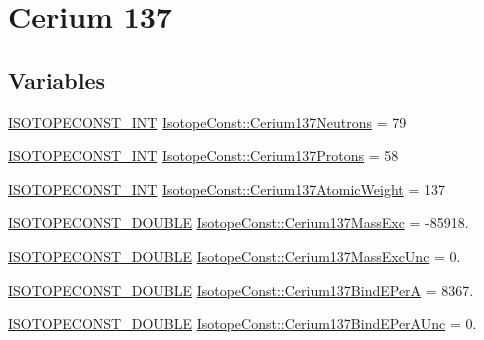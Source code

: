 \hypertarget{group___isotope_const-_cerium-_ce137}{}\section{Cerium 137}
\label{group___isotope_const-_cerium-_ce137}
\subsection*{Variables}
\begin{DoxyCompactItemize}
\item 
\mbox{\hyperlink{group___isotope_const-_macros_ga5f18360b3e99483a35c32d789e62621c}{I\+S\+O\+T\+O\+P\+E\+C\+O\+N\+S\+T\+\_\+\+I\+NT}} \mbox{\hyperlink{group___isotope_const-_cerium-_ce137_ga23377c25175b47810b78da77ab370f87}{Isotope\+Const\+::\+Cerium137\+Neutrons}} = 79
\item 
\mbox{\hyperlink{group___isotope_const-_macros_ga5f18360b3e99483a35c32d789e62621c}{I\+S\+O\+T\+O\+P\+E\+C\+O\+N\+S\+T\+\_\+\+I\+NT}} \mbox{\hyperlink{group___isotope_const-_cerium-_ce137_gaaee6a58822cbd8ac166791f5f5d9527f}{Isotope\+Const\+::\+Cerium137\+Protons}} = 58
\item 
\mbox{\hyperlink{group___isotope_const-_macros_ga5f18360b3e99483a35c32d789e62621c}{I\+S\+O\+T\+O\+P\+E\+C\+O\+N\+S\+T\+\_\+\+I\+NT}} \mbox{\hyperlink{group___isotope_const-_cerium-_ce137_gad97ec2de878b7311ae7112dc012c27ae}{Isotope\+Const\+::\+Cerium137\+Atomic\+Weight}} = 137
\item 
\mbox{\hyperlink{group___isotope_const-_macros_ga8f45a7272ce02c0b4c65c44636ed719a}{I\+S\+O\+T\+O\+P\+E\+C\+O\+N\+S\+T\+\_\+\+D\+O\+U\+B\+LE}} \mbox{\hyperlink{group___isotope_const-_cerium-_ce137_gaa98d9bfdb6961fb1de66593b8763eb1d}{Isotope\+Const\+::\+Cerium137\+Mass\+Exc}} = -\/85918.
\item 
\mbox{\hyperlink{group___isotope_const-_macros_ga8f45a7272ce02c0b4c65c44636ed719a}{I\+S\+O\+T\+O\+P\+E\+C\+O\+N\+S\+T\+\_\+\+D\+O\+U\+B\+LE}} \mbox{\hyperlink{group___isotope_const-_cerium-_ce137_ga081c24febf1049d045e0c7a2cc1925c1}{Isotope\+Const\+::\+Cerium137\+Mass\+Exc\+Unc}} = 0.
\item 
\mbox{\hyperlink{group___isotope_const-_macros_ga8f45a7272ce02c0b4c65c44636ed719a}{I\+S\+O\+T\+O\+P\+E\+C\+O\+N\+S\+T\+\_\+\+D\+O\+U\+B\+LE}} \mbox{\hyperlink{group___isotope_const-_cerium-_ce137_ga250cb878f7b6ebae81cefc2649f2ba39}{Isotope\+Const\+::\+Cerium137\+Bind\+E\+PerA}} = 8367.
\item 
\mbox{\hyperlink{group___isotope_const-_macros_ga8f45a7272ce02c0b4c65c44636ed719a}{I\+S\+O\+T\+O\+P\+E\+C\+O\+N\+S\+T\+\_\+\+D\+O\+U\+B\+LE}} \mbox{\hyperlink{group___isotope_const-_cerium-_ce137_gac57ee9b510562e2ab7eb963ff25280fe}{Isotope\+Const\+::\+Cerium137\+Bind\+E\+Per\+A\+Unc}} = 0.

\end{DoxyCompactItemize}
